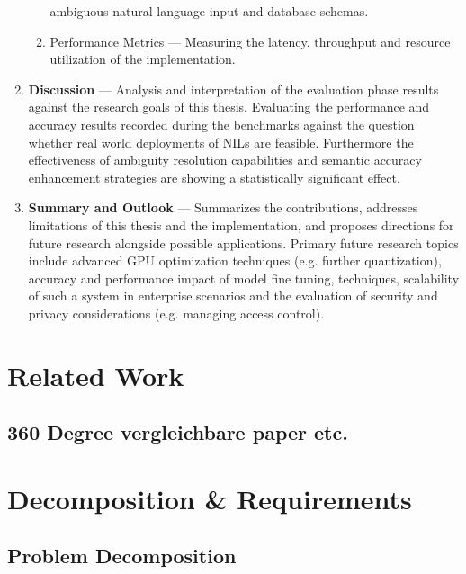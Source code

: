 \documentclass{article}
\begin{document}
\begin{enumerate}
\begin{enumerate}
                    ambiguous natural language input and database schemas.
              \item Performance Metrics — Measuring the latency, throughput and resource utilization 
                    of the implementation.
          \end{enumerate}
      \item \textbf{Discussion} — Analysis and interpretation of the evaluation phase results against
            the research goals of this thesis. Evaluating the performance and accuracy results recorded
            during the benchmarks against the question whether real world deployments of NILs are feasible.
            Furthermore the effectiveness of ambiguity resolution capabilities and semantic accuracy enhancement
            strategies are showing a statistically significant effect.
       \item \textbf{Summary and Outlook} — Summarizes the contributions, addresses limitations
            of this thesis and the implementation, and proposes directions for future research alongside
            possible applications. Primary future research topics include advanced GPU optimization
            techniques (e.g. further quantization), accuracy and performance impact of model fine tuning,
            techniques, scalability of such a system in enterprise scenarios and the evaluation of security
            and privacy considerations (e.g. managing access control).
\end{enumerate}

\newpage

\section{Related Work}

\subsection{360 Degree vergleichbare paper etc.}


\newpage

\section{Decomposition \& Requirements}

\subsection{Problem Decomposition}
\end{document}
